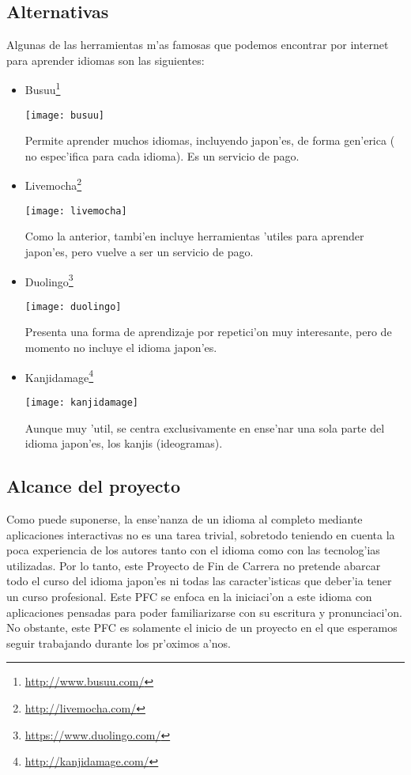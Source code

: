 \subsection{Alternativas}
\label{sub:alternativas}
Algunas de las herramientas m'as famosas que podemos encontrar por internet para aprender idiomas son las siguientes:
\begin{itemize}
 \item Busuu\footnote{\url{http://www.busuu.com/}}

 \begin{center}
 \texttt{[image: busuu]}
 \end{center}

 Permite aprender muchos idiomas, incluyendo japon'es, de forma gen'erica ( no espec'ifica para cada idioma). Es un servicio de pago.
 \item Livemocha\footnote{\url{http://livemocha.com/}}

 \begin{center}
 \texttt{[image: livemocha]}
 \end{center}

 Como la anterior, tambi'en incluye herramientas 'utiles para aprender japon'es, pero vuelve a ser un servicio de pago.
 \item Duolingo\footnote{\url{https://www.duolingo.com/}}
 
 \begin{center}
 \texttt{[image: duolingo]}
 \end{center}
 
 Presenta una forma de aprendizaje por repetici'on muy interesante, pero de momento no incluye el idioma japon'es.
 \item Kanjidamage\footnote{\url{http://kanjidamage.com/}}
 
 \begin{center}
 \texttt{[image: kanjidamage]}
 \end{center}
 
 Aunque muy 'util, se centra exclusivamente en ense'nar una sola parte del idioma japon'es, los kanjis (ideogramas).
\end{itemize}


\subsection{Alcance del proyecto}
\label{sub:alcance_del_proyecto}
Como puede suponerse, la ense'nanza de un idioma al completo mediante aplicaciones interactivas no es
una tarea trivial, sobretodo teniendo en cuenta la poca experiencia de los autores tanto con el idioma
como con las tecnolog'ias utilizadas. Por lo tanto, este Proyecto de Fin de Carrera no pretende abarcar todo el
curso del idioma japon'es ni todas las caracter'isticas que deber'ia tener un curso profesional.
Este PFC se enfoca en la iniciaci'on a este idioma con aplicaciones pensadas para poder familiarizarse
con su escritura y pronunciaci'on. No obstante, este PFC es solamente el inicio de un proyecto en el que
esperamos seguir trabajando durante los pr'oximos a'nos.

